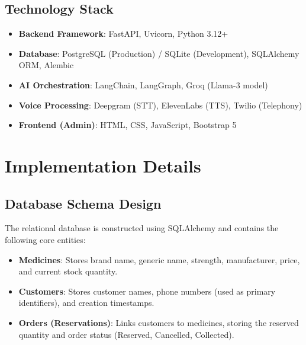 \documentclass[12pt,a4paper]{report}
\begin{document}
\section{Technology Stack}
\begin{itemize}
    \item \textbf{Backend Framework}: FastAPI, Uvicorn, Python 3.12+
    \item \textbf{Database}: PostgreSQL (Production) / SQLite (Development), SQLAlchemy ORM, Alembic
    \item \textbf{AI Orchestration}: LangChain, LangGraph, Groq (Llama-3 model)
    \item \textbf{Voice Processing}: Deepgram (STT), ElevenLabs (TTS), Twilio (Telephony)
    \item \textbf{Frontend (Admin)}: HTML, CSS, JavaScript, Bootstrap 5
\end{itemize}

\chapter{Implementation Details}

\section{Database Schema Design}
The relational database is constructed using SQLAlchemy and contains the following core entities:
\begin{itemize}
    \item \textbf{Medicines}: Stores brand name, generic name, strength, manufacturer, price, and current stock quantity.
    \item \textbf{Customers}: Stores customer names, phone numbers (used as primary identifiers), and creation timestamps.
    \item \textbf{Orders (Reservations)}: Links customers to medicines, storing the reserved quantity and order status (Reserved, Cancelled, Collected).
\end{itemize}
\end{document}
